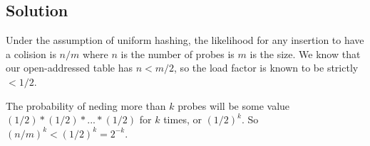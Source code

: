 \subsection*{Solution}

Under the assumption of uniform hashing, the likelihood for any insertion to have a colision is $n/m$ where $n$ is the number of probes is $m$ is the size. We know that our open-addressed table has $n < m/2$, so the load factor is known to be strictly $< 1/2$.

The probability of neding more than $k$ probes will be some value $(1/2)*(1/2)*...*(1/2)$ for $k$ times, or $(1/2)^k$. So $(n/m)^k < (1/2) ^k = 2^{-k}$.
